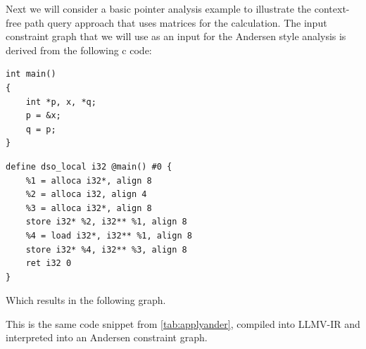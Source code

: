 Next we will consider a basic pointer analysis example to illustrate the context-free path query approach that uses matrices for the calculation.
The input constraint graph that we will use as an input for the Andersen style analysis is derived from the following c code:

\begin{center}
    \begin{minipage}[t]{0.3\textwidth}
        \begin{verbatim}
int main()
{
    int *p, x, *q;
    p = &x;
    q = p;
}
        \end{verbatim}
    \end{minipage}
    \begin{minipage}[t]{0.6\textwidth}
        \begin{verbatim}
define dso_local i32 @main() #0 {
    %1 = alloca i32*, align 8
    %2 = alloca i32, align 4
    %3 = alloca i32*, align 8
    store i32* %2, i32** %1, align 8
    %4 = load i32*, i32** %1, align 8
    store i32* %4, i32** %3, align 8
    ret i32 0
}
        \end{verbatim}
    \end{minipage}
\end{center}
Which results in the following graph.
\begin{center}
\end{center}
This is the same code snippet from \autoref{tab:applyander}, compiled into LLMV-IR and interpreted into an Andersen constraint graph.

